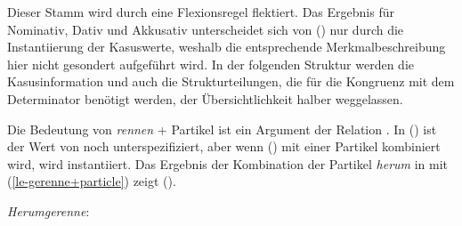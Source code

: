 \noindent
Dieser Stamm wird durch eine Flexionsregel flektiert. Das Ergebnis 
für Nominativ, Dativ und Akkusativ unterscheidet
sich von () nur durch die Instantiierung der Kasuswerte, weshalb
die entsprechende Merkmalbeschreibung hier nicht gesondert aufgeführt wird.
In der folgenden Struktur werden die Kasusinformation und auch die Strukturteilungen,
die für die Kongruenz mit dem Determinator benötigt werden, der Übersichtlichkeit
halber weggelassen.

Die Bedeutung von \emph{rennen} + Partikel  ist ein Argument der
Relation . In
() ist der Wert von  noch unterspezifiziert,
aber wenn () mit einer Partikel kombiniert wird, wird 
instantiiert. Das Ergebnis der Kombination der Partikel \emph{herum} in 
mit (\ref{le-gerenne+particle}) zeigt ().

\eas
\label{fs-Herumgerenne}
\emph{Herumgerenne}:\\
\zs

